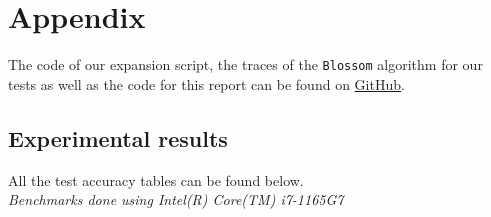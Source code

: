 \documentclass[12pt]{report}
\theoremstyle{definition}
\theoremstyle{definition}
\theoremstyle{definition}
\begin{document}
\nocite{*}





\appendix
\chapter*{Appendix}
The code of our expansion script, the traces of the \texttt{Blossom} algorithm for our tests as well as the code for
this report can be found on \href{https://github.com/Selarow/blossom}{GitHub}.


\section*{Experimental results}
All the test accuracy tables can be found below.\\
\it Benchmarks done using Intel(R) Core(TM) i7-1165G7
\end{document}
